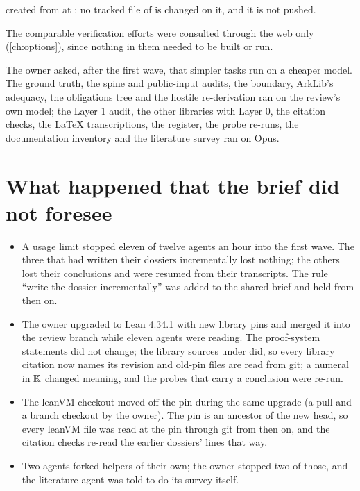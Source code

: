 \begin{description}
  created from  at ; no tracked file of  is changed on it,
  and it is not pushed.
\item[Secondary repositories.] The comparable verification efforts were consulted through the
  web only (\cref{ch:options}), since nothing in them needed to be built or run.
\item[Models.] The owner asked, after the first wave, that simpler tasks run on a cheaper
  model. The ground truth, the spine and public-input audits, the boundary, ArkLib's adequacy, the
  obligations tree and the hostile re-derivation ran on the review's own model; the Layer 1
  audit, the other libraries with Layer 0, the citation checks, the LaTeX transcriptions, the
  register, the probe re-runs, the documentation inventory and the literature survey ran on
  Opus.
\end{description}

\section{What happened that the brief did not foresee}

\begin{itemize}
\item A usage limit stopped eleven of twelve agents an hour into the first wave. The three that
  had written their dossiers incrementally lost nothing; the others lost their conclusions and
  were resumed from their transcripts. The rule \enquote{write the dossier incrementally} was
  added to the shared brief and held from then on.
\item The owner upgraded  to Lean 4.34.1 with new library pins and merged it into
  the review branch while eleven agents were reading. The proof-system statements did not
  change; the library sources under  did, so every library citation now
  names its revision and old-pin files are read from git; a numeral in $\mathbb{K}$ changed meaning,
  and the probes that carry a conclusion were re-run.
\item The leanVM checkout moved off the pin during the same upgrade (a pull and a branch
  checkout by the owner). The pin is an ancestor of the new head, so every leanVM file was
  read at the pin through git from then on, and the citation checks re-read the earlier
  dossiers' lines that way.
\item Two agents forked helpers of their own; the owner stopped two of those, and the
  literature agent was told to do its survey itself.
\end{itemize}

